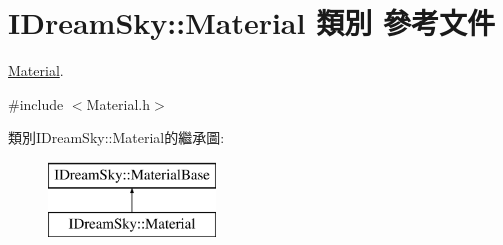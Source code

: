 \hypertarget{class_i_dream_sky_1_1_material}{}\section{I\+Dream\+Sky\+:\+:Material 類別 參考文件}
\label{class_i_dream_sky_1_1_material}


\hyperlink{class_i_dream_sky_1_1_material}{Material}.  




{\ttfamily \#include $<$Material.\+h$>$}

類別\+I\+Dream\+Sky\+:\+:Material的繼承圖\+:\begin{figure}[H]
\begin{center}
\leavevmode
\includegraphics[height=2.000000cm]{class_i_dream_sky_1_1_material}
\end{center}
\end{figure}
